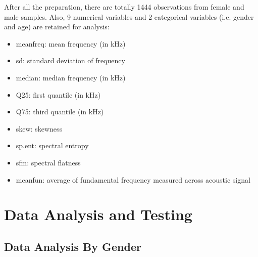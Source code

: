 \documentclass{article}
\begin{document}
	After all the preparation, there are totally 1444 observations from female and male samples. Also, 9 numerical variables and 2 categorical variables (i.e. gender and age) are retained for analysis:
	\begin{itemize}
		\item meanfreq: mean frequency (in kHz)
		\item sd: standard deviation of frequency
		\item median: median frequency (in kHz)
		\item Q25: first quantile (in kHz)
		\item Q75: third quantile (in kHz)
		\item skew: skewness
		\item sp.ent: spectral entropy
		\item sfm: spectral flatness
		\item meanfun: average of fundamental frequency measured across acoustic signal
	\end{itemize}
	
	
	\section{Data Analysis and Testing}
	
	\subsection{Data Analysis By Gender}
	
\end{document}
